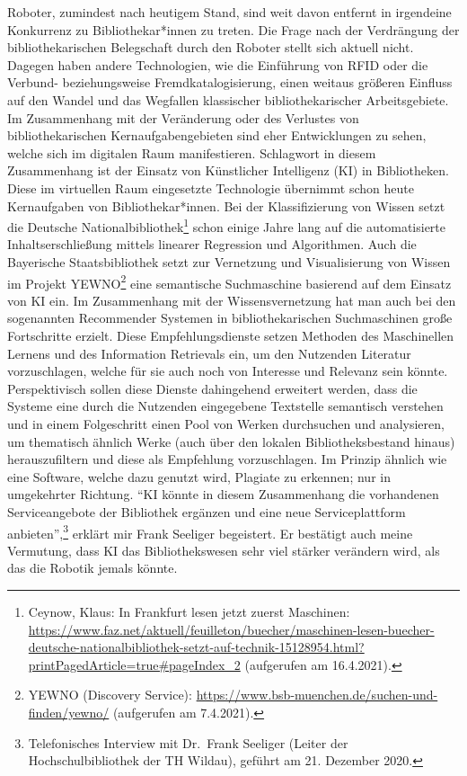 \documentclass[a4paper,
fontsize=11pt,
oneside,
numbers=noperiodatend,
parskip=half-,
bibliography=totoc,
final
]{scrartcl}
\begin{document}
Roboter, zumindest nach heutigem Stand, sind weit davon entfernt in
irgendeine Konkurrenz zu Bibliothekar*innen zu treten. Die
Frage nach der Verdrängung der bibliothekarischen Belegschaft durch den
Roboter stellt sich aktuell nicht. Dagegen haben andere Technologien,
wie die Einführung von RFID oder die Verbund- beziehungsweise
Fremdkatalogisierung, einen weitaus größeren Einfluss auf den Wandel und
das Wegfallen klassischer bibliothekarischer Arbeitsgebiete. Im
Zusammenhang mit der Veränderung oder des Verlustes von
bibliothekarischen Kernaufgabengebieten sind eher Entwicklungen zu
sehen, welche sich im digitalen Raum manifestieren. Schlagwort in diesem
Zusammenhang ist der Einsatz von Künstlicher Intelligenz (KI) in
Bibliotheken. Diese im virtuellen Raum eingesetzte Technologie übernimmt
schon heute Kernaufgaben von Bibliothekar*innen. Bei der
Klassifizierung von Wissen setzt die Deutsche Nationalbibliothek\footnote{Ceynow, Klaus: In
  Frankfurt lesen jetzt zuerst Maschinen:
  \url{https://www.faz.net/aktuell/feuilleton/buecher/maschinen-lesen-buecher-deutsche-nationalbibliothek-setzt-auf-technik-15128954.html?printPagedArticle=true\#pageIndex_2}
  (aufgerufen am 16.4.2021).} schon einige Jahre lang auf die
automatisierte Inhaltserschließung mittels linearer Regression und
Algorithmen. Auch die Bayerische Staatsbibliothek setzt zur Vernetzung
und Visualisierung von Wissen im Projekt YEWNO\footnote{YEWNO (Discovery
  Service): \url{https://www.bsb-muenchen.de/suchen-und-finden/yewno/}
  (aufgerufen am 7.4.2021).} eine semantische Suchmaschine basierend auf
dem Einsatz von KI ein. Im Zusammenhang mit der Wissensvernetzung hat
man auch bei den sogenannten Recommender Systemen in bibliothekarischen
Suchmaschinen große Fortschritte erzielt. Diese Empfehlungsdienste
setzen Methoden des Maschinellen Lernens und des Information Retrievals
ein, um den Nutzenden Literatur vorzuschlagen, welche für sie auch noch
von Interesse und Relevanz sein könnte. Perspektivisch sollen diese
Dienste dahingehend erweitert werden, dass die Systeme eine durch die
Nutzenden eingegebene Textstelle semantisch verstehen und in einem
Folgeschritt einen Pool von Werken durchsuchen und analysieren, um
thematisch ähnlich Werke (auch über den lokalen Bibliotheksbestand
hinaus) herauszufiltern und diese als Empfehlung vorzuschlagen. Im Prinzip
ähnlich wie eine Software, welche dazu genutzt wird, Plagiate zu
erkennen; nur in umgekehrter Richtung. \enquote{KI könnte in diesem
Zusammenhang die vorhandenen Serviceangebote der Bibliothek ergänzen und
eine neue Serviceplattform anbieten},\footnote{Telefonisches Interview
  mit Dr.~Frank Seeliger (Leiter der Hochschulbibliothek der TH Wildau),
  geführt am 21. Dezember 2020.} erklärt mir Frank Seeliger begeistert.
Er bestätigt auch meine Vermutung, dass KI das Bibliothekswesen sehr
viel stärker verändern wird, als das die Robotik jemals könnte.
\end{document}
